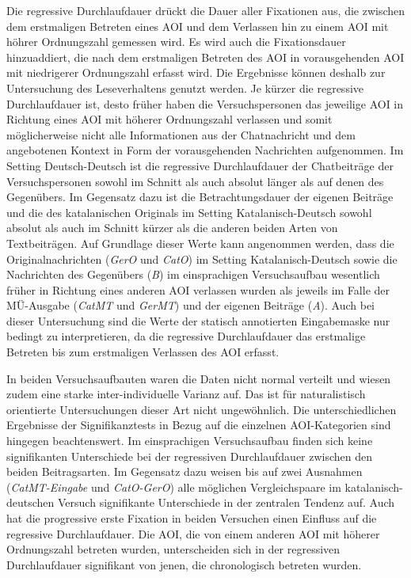 Die regressive Durchlaufdauer drückt die Dauer aller Fixationen aus, die zwischen dem erstmaligen Betreten eines AOI und dem Verlassen hin zu einem AOI mit höhrer Ordnungszahl gemessen wird. Es wird auch die Fixationsdauer hinzuaddiert, die nach dem erstmaligen Betreten des AOI in vorausgehenden AOI mit niedrigerer Ordnungszahl erfasst wird. Die Ergebnisse können deshalb zur Untersuchung des Leseverhaltens genutzt werden. Je kürzer die regressive Durchlaufdauer ist, desto früher haben die Versuchspersonen das jeweilige AOI in Richtung eines AOI mit höherer Ordnungszahl verlassen und somit möglicherweise nicht alle Informationen aus der Chatnachricht und dem angebotenen Kontext in Form der vorausgehenden Nachrichten aufgenommen. Im Setting Deutsch-Deutsch ist die regressive Durchlaufdauer der Chatbeiträge der Versuchspersonen sowohl im Schnitt als auch absolut länger als auf denen des Gegenübers. Im Gegensatz dazu ist die Betrachtungsdauer der eigenen Beiträge und die des katalanischen Originals im Setting Katalanisch-Deutsch sowohl absolut als auch im Schnitt kürzer als die anderen beiden Arten von Textbeiträgen. Auf Grundlage dieser Werte kann angenommen werden, dass die Originalnachrichten (\emph{GerO} und \emph{CatO}) im Setting Katalanisch-Deutsch sowie die Nachrichten des Gegenübers (\emph{B}) im einsprachigen Versuchsaufbau wesentlich früher in Richtung eines anderen AOI verlassen wurden als jeweils im Falle der MÜ-Ausgabe (\emph{CatMT} und \emph{GerMT}) und der eigenen Beiträge (\emph{A}). Auch bei dieser Untersuchung sind die Werte der statisch annotierten Eingabemaske nur bedingt zu interpretieren, da die regressive Durchlaufdauer das erstmalige Betreten bis zum erstmaligen Verlassen des AOI erfasst. 

\begin{sloppypar}
In beiden Versuchsaufbauten waren die Daten nicht normal verteilt und wiesen zudem eine starke inter-individuelle Varianz auf. Das ist für naturalistisch orientierte Untersuchungen dieser Art nicht ungewöhnlich. Die unterschiedlichen Ergebnisse der Signifikanztests in Bezug auf die einzelnen AOI-Kategorien sind hingegen beachtenswert. Im einsprachigen Versuchsaufbau finden sich keine signifikanten Unterschiede bei der regressiven Durchlaufdauer zwischen den beiden Beitragsarten. Im Gegensatz dazu weisen bis auf zwei Ausnahmen (\emph{CatMT-Eingabe} und \emph{CatO-GerO}) alle möglichen Vergleichspaare im ka\-ta\-la\-nisch-deutschen Versuch signifikante Unterschiede in der zentralen Tendenz auf. Auch hat die progressive erste Fixation in beiden Versuchen einen Einfluss auf die regressive Durchlaufdauer. Die AOI, die von einem anderen AOI mit höherer Ordnungszahl betreten wurden, unterscheiden sich in der regressiven Durchlaufdauer signifikant von jenen, die chronologisch betreten wurden.
\end{sloppypar}

